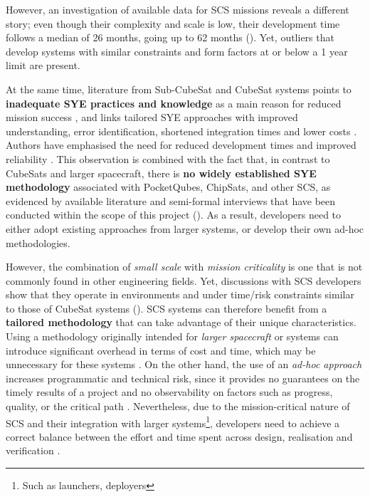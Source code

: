 \documentclass[a4paper,nobib,justified,final]{tufte-book}
\begin{document}
However, an investigation of available data for \acs{SCS} missions reveals a different story; even though their complexity and scale is low, their development time follows a median of 26 months, going up to 62 months (). Yet, outliers that develop systems with similar constraints and form factors at or below a 1 year limit are present. 

At the same time, literature from Sub-CubeSat and CubeSat systems points to \textbf{inadequate \acl{SYE} practices and knowledge} as a main reason for reduced mission success \cite{swartwoutUniversityClassSpacecraft2023,sanchoLessonsLearnedFYS2021,kinnairdSelectionLessonsLearned2022,doyleMissionTestingImproved2021,hermanExperimentalResultsModular2025}, and links tailored \acs{SYE} approaches with improved understanding, error identification, shortened integration times and lower costs \autocite{honore-livermoreIntegratingAgileSystems2022}.
Authors have emphasised the need for reduced development times \autocite{pradhanShorteningDeliveryTime2020,uludagDelfiPQInOrbitPerformance2025} and improved reliability \autocite{swartwoutCubeSatMissionSuccess2019,villelaThousandthCubeSatStatistical2019}.
This observation is combined with the fact that, in contrast to CubeSats and larger spacecraft, there is \textbf{no widely established \acl{SYE} methodology} associated with PocketQubes, ChipSats, and other \acs{SCS}, as evidenced by available literature \autocite{heinAttoSatsChipSatsOther2019,bouwmeesterUtilityConstraintsPocketQubes2020} and semi-formal interviews that have been conducted within the scope of this project (). As a result, developers need to either adopt existing approaches from larger systems, or develop their own ad-hoc methodologies.


However, the combination of \emph{small scale} with \emph{mission criticality} is one that is not commonly found in other engineering fields. Yet, discussions with \acs{SCS} developers show that they operate in environments and under time/risk constraints similar to those of CubeSat systems (). \acs{SCS} systems can therefore benefit from a \textbf{tailored methodology} that can take advantage of their unique characteristics. Using a methodology originally intended for \emph{larger spacecraft} or systems can introduce significant overhead in terms of cost and time, which may be unnecessary for these systems \autocite{clementsTailoredSystemsEngineering2020}. On the other hand, the use of an \emph{ad-hoc approach} increases programmatic and technical risk, since it provides no guarantees on the timely results of a project and no observability on factors such as progress, quality, or the critical path \autocite{honourTechnicalReportValue2004}. Nevertheless, due to the mission-critical nature of \acs{SCS} and their integration with larger systems\footnote{Such as launchers, deployers}, developers need to achieve a correct balance between the effort and time spent across design, realisation and verification \autocite{sebok_value,boehmROISystemsEngineering2008,dillonFasterBetterCheaperProjectsToo2015}.
\end{document}
